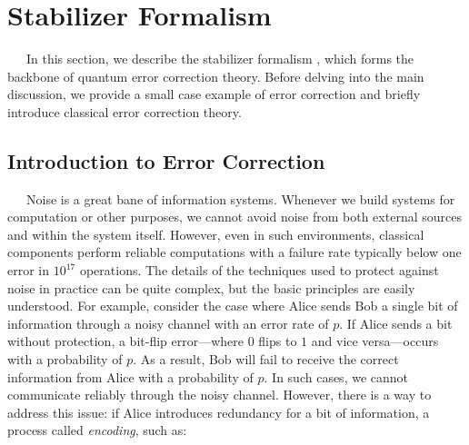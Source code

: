 \documentclass[a4paper,11pt]{ltjsarticle}
\begin{document}
\section{Stabilizer Formalism }{
    \ \ \ In this section, we describe the stabilizer formalism \cite{nielsen2010}, which forms the backbone of quantum error correction theory. Before delving into the main discussion, we provide a small case example of error correction and briefly introduce classical error correction theory.
    \subsection{Introduction to Error Correction}\label{introduction_to_error_correction}{
        \ \ \ Noise is a great bane of information systems. Whenever we build systems for computation or other purposes, we cannot avoid noise from both external sources and within the system itself. However, even in such environments, classical components perform reliable computations with a failure rate typically below one error in $10^{17}$ operations. The details of the techniques used to protect against noise in practice can be quite complex, but the basic principles are easily understood. For example, consider the case where Alice sends Bob a single bit of information through a noisy channel with an error rate of $p$. If Alice sends a bit without protection, a bit-flip error---where $0$ flips to $1$ and vice versa---occurs with a probability of $p$. As a result, Bob will fail to receive the correct information from Alice with a probability of $p$. In such cases, we cannot communicate reliably through the noisy channel. However, there is a way to address this issue: if Alice introduces redundancy for a bit of information, a process called \textit{encoding}, such as:

}}
\end{document}

